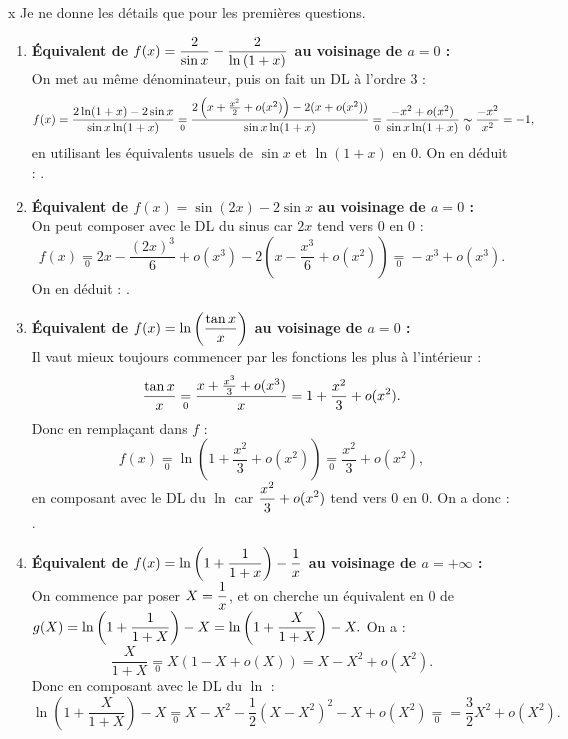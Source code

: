 \documentclass[a4paper, 11pt,reqno]{article}
\begin{document}
\begin{correction} \;x
	Je ne donne les d\'etails que pour les premi\`eres questions.
	\begin{enumerate}
		\item \textbf{\'Equivalent de $f(x)=\displaystyle\frac{2}{\sin{x}} -\displaystyle\frac{2}{\ln{(1+x)}}$ au voisinage de $a=0$ :}\\
		      On met au m\^eme d\'enominateur, puis on fait un DL \`a l'ordre 3 :
		      $$f(x) = \frac{2\ln(1+x) - 2 \sin x}{\sin x \ln(1+x)} \underset{0}{=} \frac{2\left(x+\frac{x^2}{2}+o(x^2)\right) - 2 (x+o(x^2))}{\sin x \ln(1+x)} \underset{0}{=}  \frac{-x^2+o(x^2)}{\sin x \ln(1+x)} \underset{0}{\thicksim} \frac{-x^2}{x^2} = -1,$$
		      en utilisant les \'equivalents usuels de $\sin x$ et $\ln(1+x)$ en $0$. On en d\'eduit : .
		\item \textbf{\'Equivalent de $f(x)=\sin{(2x)}-2\sin{x}$ au voisinage de $a=0$ :}\\
		      On peut composer avec le DL du sinus car $2x$ tend vers $0$ en $0$ :
		      $$f(x) \underset{0}{=} 2x - \frac{(2x)^3}{6} + o(x^3) - 2 \left(x-\frac{x^3}{6} +o(x^2) \right) \underset{0}{=}  - x^3 + o(x^3).$$
		      On en d\'eduit : .
		\item \textbf{\'Equivalent de  $f(x)=\ln{\left( \displaystyle\frac{\tan{x}}{x} \right)}$ au voisinage de $a=0$ :}\\
		      Il vaut mieux toujours commencer par les fonctions les plus \`a l'int\'erieur :
		      $$\displaystyle\frac{\tan{x}}{x}   \underset{0}{=} \frac{x+\frac{x^3}{3} + o(x^3)}{x} = 1 + \frac{x^2}{3}+o(x^2).$$
		      Donc en rempla\c cant dans $f$ :
		      $$f(x) \underset{0}{=} \ln\left(1+\frac{x^2}{3}+o(x^2)\right)  \underset{0}{=}  \frac{x^2}{3} + o(x^2),$$
		      en composant avec le DL du $\ln$ car $\displaystyle \frac{x^2}{3} + o(x^2)$ tend vers $0$ en $0$. On a donc : .
		\item  \textbf{\'Equivalent de $f(x)=\ln{\left( 1+\displaystyle\frac{1}{1+x} \right)}-\displaystyle\frac{1}{x}$ au voisinage de $a=+\infty$ :}\\
		      On commence par poser $X=\displaystyle\frac{1}{x}$, et on cherche un \'equivalent en $0$ de $\displaystyle g(X) = \ln \left(1+ \frac{1}{1+X}\right) - X = \ln \left(1+\frac{X}{1+X}\right)-X.$ On a :
		      $$\frac{X}{1+X} \underset{0}{=} X (1-X+o(X)) = X-X^2+o(X^2).$$
		      Donc en composant avec le DL du $\ln$ :
		      $$ \ln \left(1+\frac{X}{1+X}\right)-X \underset{0}{=} X-X^2 - \frac{1}{2}\left(X-X^2 \right)^2 -X + o(X^2) \underset{0}{=} = \frac{3}{2} X^2 + o(X^2).$$

\end{enumerate}
\end{correction}
\end{document}
